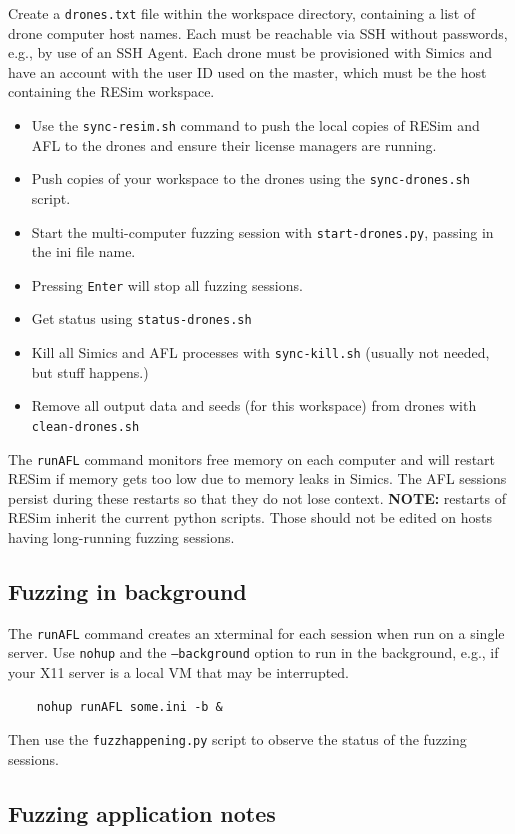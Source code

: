 \documentclass[titlepage]{article}
\begin{document}
Create a {\tt drones.txt} file within the workspace directory, containing a list of drone computer host names.  Each must be reachable
via SSH without passwords, e.g., by use of an SSH Agent.  Each drone must be provisioned with Simics and have an account with the user ID used
on the master, which must be the host containing the RESim workspace. 
\begin{itemize}
\item Use the {\tt sync-resim.sh} command to push the local copies of RESim and AFL to the drones and ensure their license managers are running.
\item Push copies of your workspace to the drones using the {\tt sync-drones.sh} script.
\item Start the multi-computer fuzzing session with {\tt start-drones.py}, passing in the ini file name.
\item Pressing {\tt Enter} will stop all fuzzing sessions.
\item Get status using {\tt status-drones.sh}
\item Kill all Simics and AFL processes with {\tt sync-kill.sh} (usually not needed, but stuff happens.)
\item Remove all output data and seeds (for this workspace) from drones with {\tt clean-drones.sh}
\end{itemize}

The {\tt runAFL} command monitors free memory on each computer and will restart RESim if memory gets too low due to
memory leaks in Simics.  The AFL sessions persist during these restarts so that they do not lose context.  \textbf{NOTE:} restarts of RESim
inherit the current python scripts.  Those should not be edited on hosts having long-running fuzzing sessions.

\subsection{Fuzzing in background}
The {\tt runAFL} command creates an xterminal for each session when run on a single server.  Use {\tt nohup} and the {\tt --background} option to 
run in the background, e.g., if your X11 server is a local VM that may be interrupted.
\begin{verbatim}
    nohup runAFL some.ini -b &
\end{verbatim}
Then use the {\tt fuzzhappening.py} script to observe the status of the fuzzing sessions.

\subsection{Fuzzing application notes}
\end{document}
